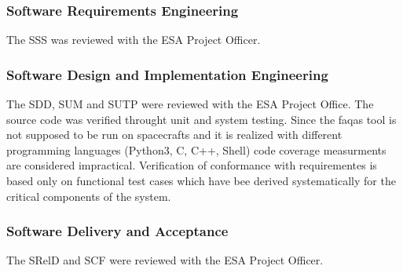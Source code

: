 
\subsubsection{Software Requirements Engineering}
The SSS was reviewed with the ESA Project Officer.

\subsubsection{Software Design and Implementation Engineering}
The SDD, SUM and SUTP were reviewed with the ESA Project Office.
The source code was verified throught unit and system testing.
Since the faqas tool is not supposed to be run on spacecrafts and it is realized with different programming languages (Python3, C, C++, Shell) code coverage measurments are considered impractical.
Verification of conformance with requirementes is based only on functional test cases which have bee derived systematically for the critical components of the system.

\subsubsection{Software Delivery and Acceptance}
The SRelD and SCF were reviewed with the ESA Project Officer.

